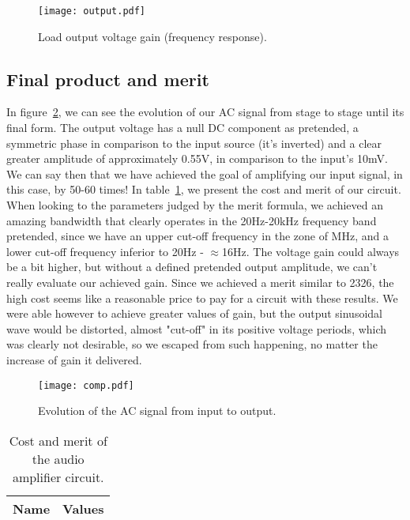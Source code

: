 \begin{figure}[!h] \centering
\texttt{[image: output.pdf]}
\caption{Load output voltage gain (frequency response).}
\label{fig:outputstage}
\end{figure}

\subsection{Final product and merit}
In figure~\ref{fig:comp}, we can see the evolution of our AC signal from stage to stage until its final form. The output voltage has a null DC component as pretended, a symmetric phase in comparison to the input source (it's inverted) and a clear greater amplitude of approximately 0.55V, in comparison to the input's 10mV. We can say then that we have achieved the goal of amplifying our input signal, in this case, by 50-60 times!
In table~\ref{tab:merit}, we present the cost and merit of our circuit. When looking to the parameters judged by the merit formula, we achieved an amazing bandwidth that clearly operates in the 20Hz-20kHz frequency band pretended, since we have an upper cut-off frequency in the zone of MHz, and a lower cut-off frequency inferior to 20Hz - $\approx$16Hz. The voltage gain could always be a bit higher, but without a defined pretended output amplitude, we can't really evaluate our achieved gain. Since we achieved a merit similar to 2326, the high cost seems like a reasonable price to pay for a circuit with these results. We were able however to achieve greater values of gain, but the output sinusoidal wave would be distorted, almost "cut-off" in its positive voltage periods, which was clearly not desirable, so we escaped from such happening, no matter the increase of gain it delivered.

\begin{figure}[!h] \centering
\texttt{[image: comp.pdf]}
\caption{Evolution of the AC signal from input to output.}
\label{fig:comp}
\end{figure}

\begin{table}[h]
  \centering
  \begin{tabular}{|l|r|}
    \hline    
    {\bf Name} & {\bf Values} \\ \hline
     
  \end{tabular}
  \caption{Cost and merit of the audio amplifier circuit.}
  \label{tab:merit}
\end{table}

\par
